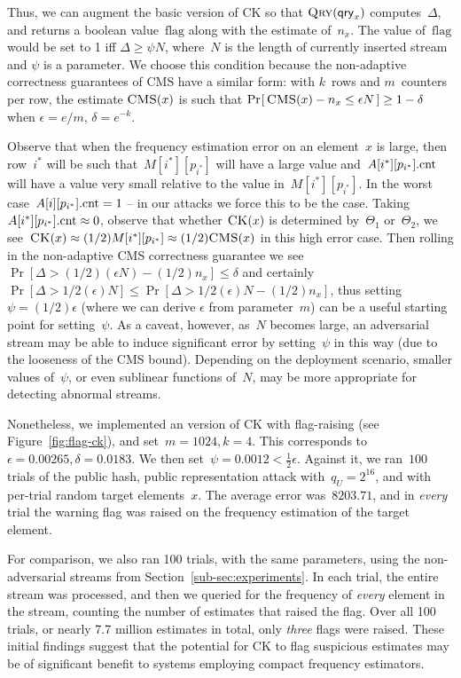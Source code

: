 Thus, we can augment the basic version of CK so that $\textnormal{\textsc{Qry}}(\mathsf{qry}_x)$ 
computes~$\Delta$, and returns a boolean value~$\mathrm{flag}$ along with the estimate of~$n_x$.  The value of~$\mathrm{flag}$ would be set to 1 iff $\Delta \geq \psi N$, where~$N$ is the length of currently inserted stream and $\psi$ is a parameter.  We choose this condition because the non-adaptive correctness guarantees of CMS have a similar form: with $k$~rows and $m$~counters per row, the estimate $\textnormal{\textsc{CMS}}(x)$ is such that $\Pr\hspace{-1pt}\left[\,\textnormal{\textsc{CMS}}(x) - n_x \leq \epsilon N\,\right] \geq 1-\delta$ when $\epsilon = e/m$, $\delta=e^{-k}$. 

Observe that when the frequency estimation error on an element~$x$ is large, then row~$i^*$ will be such that~$M[i^*][p_{i^*}]$ will have a large value and~$A[i^*][p_{i^*}].\textup{cnt}$ will have a value very small relative to the value in~$M[i^*][p_{i^*}]$. In the worst case~$A[i][p_{i^*}].\textup{cnt}=1$ -- in our attacks we force this to be the case. Taking~$A[i^*][p_{i^*}].\textup{cnt} \approx 0$, observe that whether $\textnormal{\textsc{CK}}(x)$ is determined by~$\Theta_1$ or~$\Theta_2$, we see~$\textnormal{\textsc{CK}}(x) \approx (1/2)M[i^*][p_{i^*}] \approx (1/2)\textnormal{\textsc{CMS}}(x)$ in this high error case. Then rolling in the non-adaptive CMS correctness guarantee we see $\Pr[\Delta > (1/2)(\epsilon N) - (1/2)n_x] \leq \delta$ and certainly $\Pr[\Delta > 1/2(\epsilon)N] \leq \Pr[\Delta > 1/2(\epsilon)N - (1/2)n_x]$, thus setting~$\psi = (1/2)\epsilon$ (where we can derive $\epsilon$ from parameter~$m$) can be a useful starting point for setting~$\psi$. As a caveat, however, as~$N$ becomes large, an adversarial stream may be able to induce significant error by setting~$\psi$ in this way (due to the looseness of the CMS bound).  Depending on the deployment scenario, smaller values of~$\psi$, or even sublinear functions of~$N$, may be more appropriate for detecting abnormal streams.

Nonetheless, we implemented an version of CK with flag-raising (see Figure~\ref{fig:flag-ck}), and set~$m=1024,k=4$. This corresponds to~$\epsilon=0.00265,\delta=0.0183$. We then set~$\psi = 0.0012 < \frac{1}{2} \epsilon$. Against it, we ran~$100$ trials of the public hash, public representation attack with~$q_U = 2^{16}$, and with per-trial random target elements~$x$. The average error was~$8203.71$, and in \emph{every} trial the warning flag was raised on the frequency estimation of the target element.

For comparison, we also ran 100 trials, with the same parameters, using the non-adversarial streams from Section~\ref{sub-sec:experiments}. In each trial, the entire stream was processed, and then we queried for the frequency of \emph{every} element in the stream, counting the number of estimates that raised the flag.  Over all 100 trials, or nearly 7.7 million estimates in total, only \emph{three} flags were raised.  These initial findings suggest that the potential for CK to flag suspicious estimates may be of significant benefit to systems employing compact frequency estimators.

